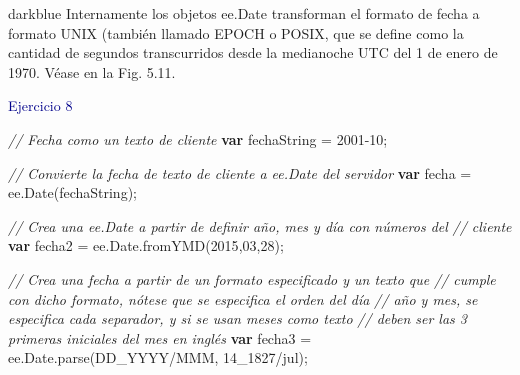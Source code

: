 \documentclass[
  12pt,
  letterpaper,
  twoside]{book}
\newenvironment{Shaded}{\begin{snugshade}}{\end{snugshade}}
\newcommand{\AttributeTok}[1]{\textcolor[rgb]{0.48,0.12,0.64}{#1}}
\newcommand{\BaseNTok}[1]{\textcolor[rgb]{0.28,0.53,0.93}{#1}}
\newcommand{\CommentTok}[1]{\textcolor[rgb]{0.24,0.58,0.00}{\textit{#1}}}
\newcommand{\ControlFlowTok}[1]{\textcolor[rgb]{0.00,0.00,0.00}{\textbf{#1}}}
\newcommand{\DecValTok}[1]{\textcolor[rgb]{0.28,0.53,0.93}{#1}}
\newcommand{\FunctionTok}[1]{\textcolor[rgb]{0.48,0.12,0.64}{#1}}
\newcommand{\KeywordTok}[1]{\textcolor[rgb]{0.48,0.12,0.64}{#1}}
\newcommand{\NormalTok}[1]{#1}
\newcommand{\OperatorTok}[1]{\textcolor[rgb]{0.00,0.00,0.00}{#1}}
\newcommand{\StringTok}[1]{\textcolor[rgb]{0.87,0.29,0.22}{#1}}
\begin{document}
\begin{bluebox2}

\begin{awesomeblock}{5pt}{\faLightbulb}{darkblue}
Internamente los objetos ee.Date transforman el formato de fecha a formato UNIX (también llamado EPOCH o POSIX, que se define como la cantidad de segundos transcurridos desde la medianoche UTC del 1 de enero de 1970. Véase en la Fig. 5.11.

\end{awesomeblock}

\end{bluebox2}

\textcolor{darkblue}{Ejercicio 8}

\begin{Shaded}
\begin{Highlighting}[]
\CommentTok{// Fecha como un texto de cliente}
\ControlFlowTok{var}\NormalTok{ fechaString }\OperatorTok{=} \StringTok{\textquotesingle{}2001{-}10\textquotesingle{}}\OperatorTok{;}

\CommentTok{// Convierte la fecha de texto de cliente a ee.Date del servidor    }
\ControlFlowTok{var}\NormalTok{ fecha }\OperatorTok{=} \KeywordTok{ee}\OperatorTok{.}\FunctionTok{Date}\NormalTok{(fechaString)}\OperatorTok{;}  

\CommentTok{// Crea una ee.Date a partir de definir año, mes y día con números del }
\CommentTok{// cliente           }
\ControlFlowTok{var}\NormalTok{ fecha2 }\OperatorTok{=} \KeywordTok{ee}\OperatorTok{.}\AttributeTok{Date}\OperatorTok{.}\FunctionTok{fromYMD}\NormalTok{(}\DecValTok{2015}\OperatorTok{,}\BaseNTok{03}\OperatorTok{,}\DecValTok{28}\NormalTok{)}\OperatorTok{;} 
   
\CommentTok{// Crea una fecha a partir de un formato especificado y un texto que }
\CommentTok{// cumple con dicho formato, nótese que se especifica el orden del día }
\CommentTok{// año y mes, se especifica cada separador, y si se usan meses como texto}
\CommentTok{// deben ser las 3 primeras iniciales del mes en inglés}
\ControlFlowTok{var}\NormalTok{ fecha3 }\OperatorTok{=} \KeywordTok{ee}\OperatorTok{.}\AttributeTok{Date}\OperatorTok{.}\FunctionTok{parse}\NormalTok{(}\StringTok{\textquotesingle{}DD\_YYYY/MMM\textquotesingle{}}\OperatorTok{,} \StringTok{\textquotesingle{}14\_1827/jul\textquotesingle{}}\NormalTok{)}\OperatorTok{;} 
\end{Highlighting}
\end{Shaded}
\end{document}
